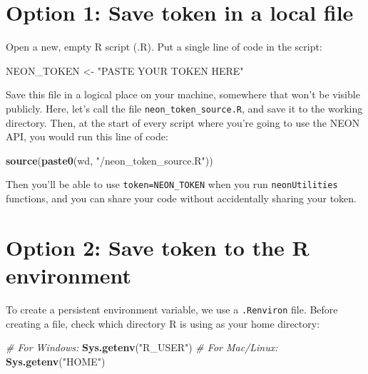 \documentclass[]{book}
\newenvironment{Shaded}{\begin{snugshade}}{\end{snugshade}}
\newcommand{\CommentTok}[1]{\textcolor[rgb]{0.56,0.35,0.01}{\textit{#1}}}
\newcommand{\KeywordTok}[1]{\textcolor[rgb]{0.13,0.29,0.53}{\textbf{#1}}}
\newcommand{\NormalTok}[1]{#1}
\newcommand{\StringTok}[1]{\textcolor[rgb]{0.31,0.60,0.02}{#1}}
\begin{document}
\hypertarget{option-1-save-token-in-a-local-file}{%
\section{Option 1: Save token in a local file}\label{option-1-save-token-in-a-local-file}}

Open a new, empty R script (.R). Put a single line of code in the script:

\begin{Shaded}
\begin{Highlighting}[]
\NormalTok{NEON_TOKEN <-}\StringTok{ "PASTE YOUR TOKEN HERE"}
\end{Highlighting}
\end{Shaded}

Save this file in a logical place on your machine, somewhere that won't be
visible publicly. Here, let's call the file \texttt{neon\_token\_source.R}, and
save it to the working directory. Then, at the start of
every script where you're going to use the NEON API, you would run this line
of code:

\begin{Shaded}
\begin{Highlighting}[]
\KeywordTok{source}\NormalTok{(}\KeywordTok{paste0}\NormalTok{(wd, }\StringTok{"/neon_token_source.R"}\NormalTok{))}
\end{Highlighting}
\end{Shaded}

Then you'll be able to use \texttt{token=NEON\_TOKEN} when you run \texttt{neonUtilities}
functions, and you can share your code without accidentally sharing your
token.

\hypertarget{option-2-save-token-to-the-r-environment}{%
\section{Option 2: Save token to the R environment}\label{option-2-save-token-to-the-r-environment}}

To create a persistent environment variable, we use a \texttt{.Renviron} file.
Before creating a file, check which directory R is using as your home
directory:

\begin{Shaded}
\begin{Highlighting}[]
\CommentTok{# For Windows:}
\KeywordTok{Sys.getenv}\NormalTok{(}\StringTok{"R_USER"}\NormalTok{)}
\CommentTok{# For Mac/Linux:}
\KeywordTok{Sys.getenv}\NormalTok{(}\StringTok{"HOME"}\NormalTok{)}
\end{Highlighting}
\end{Shaded}
\end{document}

